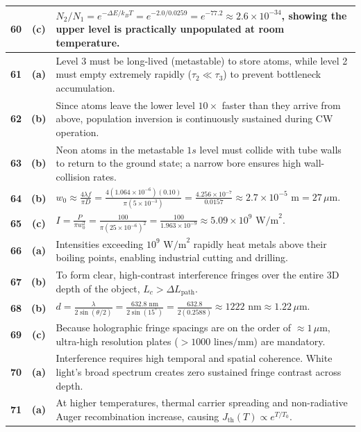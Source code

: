 {\begin{tabularx}{\textwidth}{|c|c|X|}
\textbf{60} & \textbf{(c)} & $N_2/N_1 = e^{-\Delta E / k_BT} = e^{-2.0 / 0.0259} = e^{-77.2} \approx 2.6 \times 10^{-34}$, showing the upper level is practically unpopulated at room temperature. \\ \hline
\textbf{61} & \textbf{(a)} & Level 3 must be long-lived (metastable) to store atoms, while level 2 must empty extremely rapidly ($\tau_2 \ll \tau_3$) to prevent bottleneck accumulation. \\ \hline
\textbf{62} & \textbf{(b)} & Since atoms leave the lower level $10\times$ faster than they arrive from above, population inversion is continuously sustained during CW operation. \\ \hline
\textbf{63} & \textbf{(b)} & Neon atoms in the metastable $1s$ level must collide with tube walls to return to the ground state; a narrow bore ensures high wall-collision rates. \\ \hline
\textbf{64} & \textbf{(b)} & $w_0 \approx \frac{4\lambda f}{\pi D} = \frac{4(1.064 \times 10^{-6})(0.10)}{\pi (5 \times 10^{-3})} = \frac{4.256 \times 10^{-7}}{0.0157} \approx 2.7 \times 10^{-5}\text{ m} = 27\,\mu\text{m}$. \\ \hline
\textbf{65} & \textbf{(c)} & $I = \frac{P}{\pi w_0^2} = \frac{100}{\pi (25 \times 10^{-6})^2} = \frac{100}{1.963 \times 10^{-9}} \approx 5.09 \times 10^9\text{ W/m}^2$. \\ \hline
\textbf{66} & \textbf{(a)} & Intensities exceeding $10^9\text{ W/m}^2$ rapidly heat metals above their boiling points, enabling industrial cutting and drilling. \\ \hline
\textbf{67} & \textbf{(b)} & To form clear, high-contrast interference fringes over the entire 3D depth of the object, $L_c > \Delta L_{\text{path}}$. \\ \hline
\textbf{68} & \textbf{(b)} & $d = \frac{\lambda}{2\sin(\theta/2)} = \frac{632.8\text{ nm}}{2\sin(15^\circ)} = \frac{632.8}{2(0.2588)} \approx 1222\text{ nm} \approx 1.22\,\mu\text{m}$. \\ \hline
\textbf{69} & \textbf{(c)} & Because holographic fringe spacings are on the order of $\approx 1\,\mu\text{m}$, ultra-high resolution plates ($> 1000\text{ lines/mm}$) are mandatory. \\ \hline
\textbf{70} & \textbf{(a)} & Interference requires high temporal and spatial coherence. White light's broad spectrum creates zero sustained fringe contrast across depth. \\ \hline
\textbf{71} & \textbf{(a)} & At higher temperatures, thermal carrier spreading and non-radiative Auger recombination increase, causing $J_{\text{th}}(T) \propto e^{T/T_0}$. \\ \hline

\end{tabularx}}
